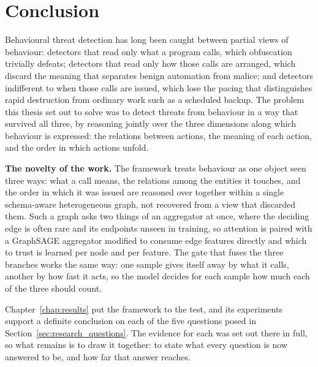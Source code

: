 \documentclass[%
    BCOR=10mm,
    DIV=13,
    toc=bibliography,
    toc=listof,
    oneside,
    12pt,
]{scrbook}
\begin{document}
\section{Conclusion}
\label{sec:conclusion}

Behavioural threat detection has long been caught between partial views of behaviour:
detectors that read only what a program calls, which obfuscation trivially defeats;
detectors that read only how those calls are arranged, which discard the meaning that
separates benign automation from malice; and detectors indifferent to when those
calls are issued, which lose the pacing that distinguishes rapid destruction from
ordinary work such as a scheduled backup. The problem this thesis set out to
solve was to detect threats from behaviour in a way that survived all three, by
reasoning
jointly over the three dimensions along which behaviour is expressed: the relations
between actions, the meaning of each action, and the order in which actions unfold.

\textbf{The novelty of the work.} The framework treats behaviour as one object
seen three ways: what a call means, the relations among the entities it touches,
and the order in which it was issued are reasoned over together within a single
schema-aware heterogeneous graph, not recovered from a view that discarded them.
Such a graph asks two things of an aggregator at once, where the deciding edge is
often rare and its endpoints unseen in training, so attention is paired with a
GraphSAGE aggregator modified to consume edge features directly and which to trust
is learned per node and per feature. The gate that fuses the three branches works
the same way: one sample gives itself away by what it calls, another by how fast it
acts, so the model decides for each sample how much each of the three should
count.

Chapter~\ref{chap:results} put the framework to the test, and its experiments
support a definite conclusion on each of the five questions posed in
Section~\ref{sec:research_questions}. The evidence for each was set out there in
full, so what remains is to draw it together: to state what every question is now
answered to be, and how far that answer reaches.
\end{document}
